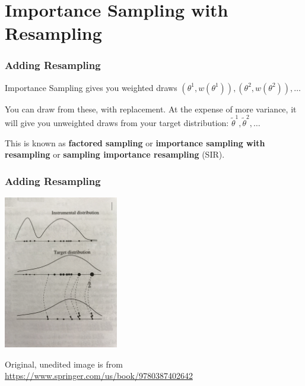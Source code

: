 \documentclass{beamer}
\begin{document}
\section{Importance Sampling with Resampling}
\begin{frame}[fragile]
\frametitle{Adding Resampling}

Importance Sampling gives you weighted draws $(\theta^1, w(\theta^1) ), (\theta^2, w(\theta^2) ), \ldots$
\newline

You can draw from these, with replacement. At the expense of more variance, it will give you unweighted draws from your target distribution:
$\tilde{\theta}^1, \tilde{\theta}^2, \ldots $
\newline

This is known as {\bf factored sampling} or {\bf importance sampling with resampling} or {\bf sampling importance resampling} (SIR).


\end{frame}

\begin{frame}[fragile]
\frametitle{Adding Resampling}

\begin{center}
\includegraphics[width=50mm]{isr.jpg}
\end{center}
Original, unedited image is from \url{https://www.springer.com/us/book/9780387402642}

\end{frame}




\end{document}
